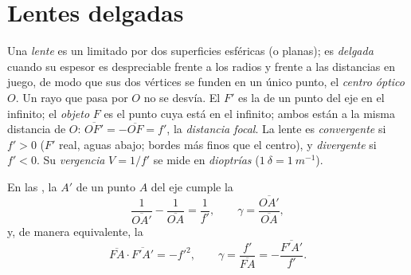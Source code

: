 \section{Lentes delgadas}

\begin{definition}\label{def:b1:mirrors-thin-lenses:lens}
Una \emph{lente} es un  limitado por dos superficies
esféricas (o planas); es \emph{delgada} cuando su espesor es despreciable
frente a los radios y frente a las distancias en juego, de modo que sus
dos vértices se funden en un único punto, el \emph{centro óptico} $O$. Un
rayo que pasa por $O$ no se desvía. El \emph{ } $F'$ es la
 de un punto del eje en el infinito; el \emph{ objeto} $F$ es el
punto cuya  está en el infinito; ambos están a la misma distancia de
$O$: $\overline{OF'} = -\overline{OF} = f'$, la \emph{distancia focal}.
La lente es \emph{convergente} si $f' > 0$ ($F'$ real, aguas abajo; bordes
más finos que el centro), y \emph{divergente} si $f' < 0$. Su
\emph{vergencia} $V = 1/f'$ se mide en \emph{dioptrías}
($\qty{1}{\delta} = \qty{1}{m^{-1}}$).
\end{definition}

\begin{theorem}\label{thm:b1:mirrors-thin-lenses:lensconj}
En las , la  $A'$ de un punto $A$ del eje
cumple la 
\[
\frac{1}{\overline{OA'}} - \frac{1}{\overline{OA}} = \frac{1}{f'},
\qquad
\gamma = \frac{\overline{OA'}}{\overline{OA}},
\]
y, de manera equivalente, la 
\[
\overline{FA}\cdot\overline{F'A'} = -f'^2,
\qquad
\gamma = \frac{f'}{\overline{FA}} = -\frac{\overline{F'A'}}{f'} .
\]
\end{theorem}

